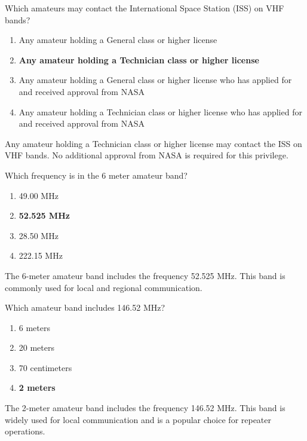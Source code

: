 \begin{tcolorbox}[colback=gray!10!white,colframe=black!75!black,title={T1B02}]
    Which amateurs may contact the International Space Station (ISS) on VHF bands?
    \begin{enumerate}[label=\Alph*,noitemsep]
        \item Any amateur holding a General class or higher license
        \item \textbf{Any amateur holding a Technician class or higher license}
        \item Any amateur holding a General class or higher license who has applied for and received approval from NASA
        \item Any amateur holding a Technician class or higher license who has applied for and received approval from NASA
    \end{enumerate}
\end{tcolorbox}
Any amateur holding a Technician class or higher license may contact the ISS on VHF bands. No additional approval from NASA is required for this privilege.


\begin{tcolorbox}[colback=gray!10!white,colframe=black!75!black,title={T1B03}]
    Which frequency is in the 6 meter amateur band?
    \begin{enumerate}[label=\Alph*,noitemsep]
        \item 49.00 MHz
        \item \textbf{52.525 MHz}
        \item 28.50 MHz
        \item 222.15 MHz
    \end{enumerate}
\end{tcolorbox}
The 6-meter amateur band includes the frequency 52.525 MHz. This band is commonly used for local and regional communication.


\begin{tcolorbox}[colback=gray!10!white,colframe=black!75!black,title={T1B04}]
    Which amateur band includes 146.52 MHz?
    \begin{enumerate}[label=\Alph*,noitemsep]
        \item 6 meters
        \item 20 meters
        \item 70 centimeters
        \item \textbf{2 meters}
    \end{enumerate}
\end{tcolorbox}
The 2-meter amateur band includes the frequency 146.52 MHz. This band is widely used for local communication and is a popular choice for repeater operations.

